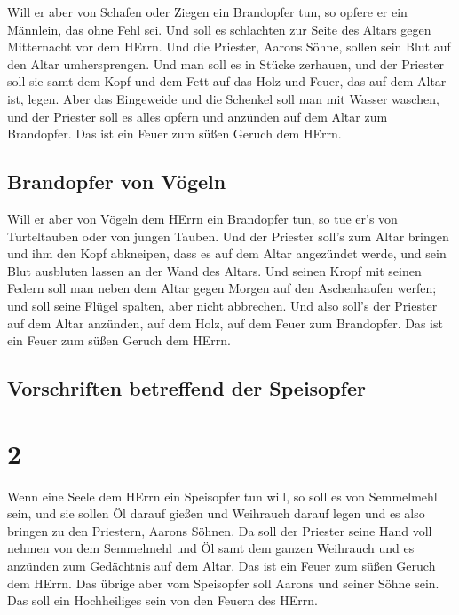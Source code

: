  Will er aber von Schafen oder Ziegen ein Brandopfer tun,
so opfere er ein Männlein, das ohne Fehl sei.  Und soll
es schlachten zur Seite des Altars gegen Mitternacht vor dem HErrn. Und
die Priester, Aarons Söhne, sollen sein Blut auf den Altar
umhersprengen.  Und man soll es in Stücke zerhauen, und
der Priester soll sie samt dem Kopf und dem Fett auf das Holz und Feuer,
das auf dem Altar ist, legen.  Aber das Eingeweide und
die Schenkel soll man mit Wasser waschen, und der Priester soll es alles
opfern und anzünden auf dem Altar zum Brandopfer. Das ist ein Feuer zum
süßen Geruch dem HErrn.

\hypertarget{brandopfer-von-vuxf6geln}{%
\subsection{Brandopfer von Vögeln}\label{brandopfer-von-vuxf6geln}}

 Will er aber von Vögeln dem HErrn ein Brandopfer tun, so
tue er's von Turteltauben oder von jungen Tauben.  Und
der Priester soll's zum Altar bringen und ihm den Kopf abkneipen, dass
es auf dem Altar angezündet werde, und sein Blut ausbluten lassen an der
Wand des Altars.  Und seinen Kropf mit seinen Federn soll
man neben dem Altar gegen Morgen auf den Aschenhaufen werfen;
 und soll seine Flügel spalten, aber nicht abbrechen. Und
also soll's der Priester auf dem Altar anzünden, auf dem Holz, auf dem
Feuer zum Brandopfer. Das ist ein Feuer zum süßen Geruch dem HErrn.

\hypertarget{vorschriften-betreffend-der-speisopfer}{%
\subsection{Vorschriften betreffend der
Speisopfer}\label{vorschriften-betreffend-der-speisopfer}}

\hypertarget{section-1}{%
\section{2}\label{section-1}}

 Wenn eine Seele dem HErrn ein Speisopfer tun will, so
soll es von Semmelmehl sein, und sie sollen Öl darauf gießen und
Weihrauch darauf legen  und es also bringen zu den
Priestern, Aarons Söhnen. Da soll der Priester seine Hand voll nehmen
von dem Semmelmehl und Öl samt dem ganzen Weihrauch und es anzünden zum
Gedächtnis auf dem Altar. Das ist ein Feuer zum süßen Geruch dem HErrn.
 Das übrige aber vom Speisopfer soll Aarons und seiner
Söhne sein. Das soll ein Hochheiliges sein von den Feuern des HErrn.

